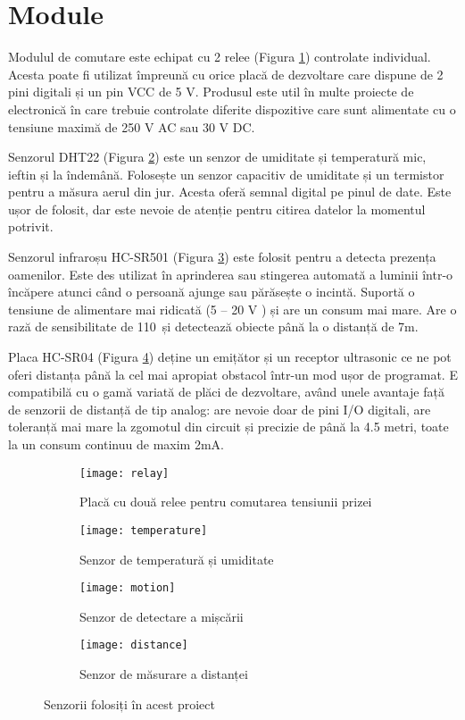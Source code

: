 \break

\section{Module} 

Modulul de comutare este echipat cu 2 relee (Figura \ref{fig:relay}) controlate individual. Acesta poate fi utilizat împreună cu orice placă de dezvoltare care dispune de 2 pini digitali și un pin VCC de 5 V. Produsul este util în multe proiecte de electronică în care trebuie controlate diferite dispozitive care sunt alimentate cu o tensiune maximă de 250 V AC sau 30 V DC.

Senzorul DHT22 (Figura \ref{fig:temperature}) este un senzor de umiditate și temperatură mic, ieftin și la îndemână. Folosește un senzor capacitiv de umiditate și un termistor pentru a măsura aerul din jur. Acesta oferă semnal digital pe pinul de date. Este ușor de folosit, dar este nevoie de atenție pentru citirea datelor la momentul potrivit.

Senzorul infraroșu HC-SR501 (Figura \ref{fig:motion}) este folosit pentru a detecta prezența oamenilor. Este des utilizat în aprinderea sau stingerea automată a luminii într-o încăpere atunci când o persoană ajunge sau părăsește o incintă. Suportă o tensiune de alimentare mai ridicată (5 – 20 V ) și are un consum mai mare. Are o rază de sensibilitate de 110\textdegree\ și detectează obiecte până la o distanță de 7m.

Placa HC-SR04 (Figura \ref{fig:distance}) deține un emițător și un receptor ultrasonic ce ne pot oferi distanța până la cel mai apropiat obstacol într-un mod ușor de programat. E compatibilă cu o gamă variată de plăci de dezvoltare, având unele avantaje față de senzorii de distanță de tip analog: are nevoie doar de pini I/O digitali, are toleranță mai mare la zgomotul din circuit și precizie de până la 4.5 metri, toate la un consum continuu de maxim 2mA.

\begin{figure}[h]
	\centering
	\begin{subfigure}{0.3\textwidth}
		\centering
		\texttt{[image: relay]}
		\caption{Placă cu două relee pentru comutarea tensiunii prizei}
		\label{fig:relay}
	\end{subfigure}
	\hfill
	\begin{subfigure}{0.3\textwidth}
		\centering
		\texttt{[image: temperature]}
		\caption{Senzor de temperatură și umiditate}
		\label{fig:temperature}
	\end{subfigure}
	
	\begin{subfigure}{0.3\textwidth}
		\centering
		\texttt{[image: motion]}
		\caption{Senzor de detectare a mișcării}
		\label{fig:motion}
	\end{subfigure}
	\hfill
	\begin{subfigure}{0.3\textwidth}
		\centering
		\texttt{[image: distance]}
		\caption{Senzor de măsurare a distanței}
		\label{fig:distance}
	\end{subfigure}
	
	\caption{Senzorii folosiți în acest proiect}
	\label{fig:all}
\end{figure}
